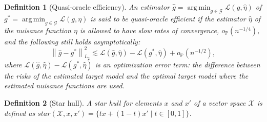 \documentclass[dvipsnames]{article} %
\DeclareMathOperator*{\argmin}{arg\,min}
\newcommand{\norm}[1]{\left\lVert#1\right\rVert}
\newtheorem{definition}{Definition}
\begin{document}
\begin{definition}[Quasi-oracle efficiency]\label{def:quasi-oracle}
An estimator \(\hat{g} = \argmin_{g \in \mathcal{G}} \mathcal{L}(g, \hat{\eta})\) of \(g^* = \argmin_{g \in \mathcal{G}}\mathcal{L}({g}, {\eta})\) is said to be {quasi-oracle efficient} if the estimator \(\hat{\eta}\) of the nuisance function $\eta$ is allowed to have slow rates of convergence, $o_{\mathbb{P}}(n^{-1/4})$, and the following still holds asymptotically:
\begin{equation} \label{eq:oracle-eff}
    \norm{\hat{g} - g^*}_{L_2}^2 \lesssim \mathcal{L}(\hat{g}, \hat{\eta}) - \mathcal{L}({g}^*, \hat{\eta}) + o_{\mathbb{P}}(n^{-1/2}),
\end{equation}
where \(\mathcal{L}(\hat{g}, \hat{\eta}) - \mathcal{L}({g}^*, \hat{\eta})\) is an optimization error term: the difference between the risks of the estimated target model and the optimal target model where the estimated nuisance functions are used. 
\end{definition}

\begin{definition}[Star hull]\label{def:star}
 A star hull \citep{foster2023orthogonal} for elements $x$ and $x'$ of a vector space $\mathcal{X}$ is defined as $star(\mathcal{X},x,x') = \{tx + (1-t)x' \mid t \in [0, 1] \}$.
\end{definition}


\newpage
\end{document}
